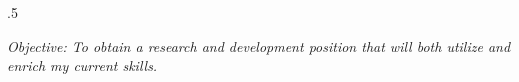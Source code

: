 \documentclass{res}
\begin{document}
 
\thispagestyle{empty} %
\address{\small
Oak Ridge National Laboratory, Virginia Tech \\
\hspace{.2in}\emph{simh@ornl.gov}, \emph{(540) 391-0202}
}

\begin{resume}
\vspace{0.01in}
\moveleft.5\sectionwidth\centerline{
{\small \it Objective: To obtain a research and development position 
that will both utilize and enrich my current skills.}
}


 
 
 
 


%





 
\end{resume}
\end{document}
